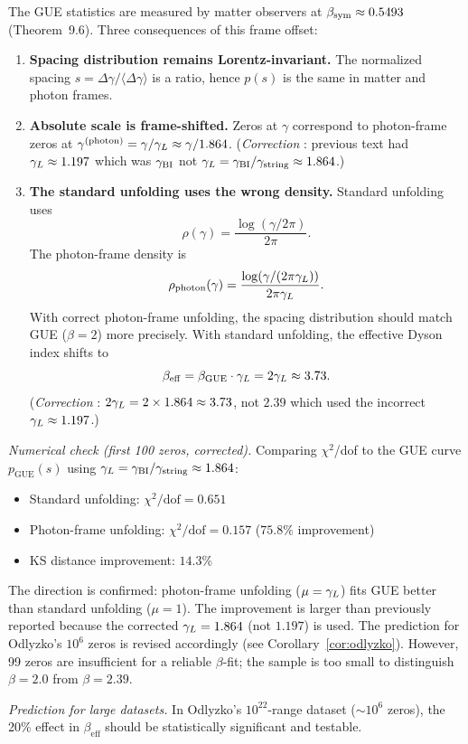 \begin{corollary}\label{cor:gue-frame}
The GUE statistics are measured by matter observers at
$\beta_{\mathrm{sym}}\approx 0.5493$ (Theorem~9.6).
Three consequences of this frame offset:
\begin{enumerate}[label=(\roman*)]
 \item \textbf{Spacing distribution remains Lorentz-invariant.}
 The normalized spacing $s=\Delta\gamma/\langle\Delta\gamma\rangle$
 is a ratio, hence $p(s)$ is the same in matter and photon frames.
 \item \textbf{Absolute scale is frame-shifted.}
 Zeros at $\gamma$ correspond to photon-frame zeros at
 $\gamma^{(\mathrm{photon})}=\gamma/\gamma_L\approx\gamma/1.864$.
 (\emph{Correction }: previous text had $\gamma_L\approx 1.197$
 which was $\gamma_{\mathrm{BI}}$ not $\gamma_L=\gamma_{\mathrm{BI}}/\gamma_{\mathrm{string}}\approx 1.864$.)
 \item \textbf{The standard unfolding uses the wrong density.}
 Standard unfolding uses
 \[
 \rho(\gamma)=\frac{\log(\gamma/2\pi)}{2\pi}.
 \]
 The photon-frame density is
 \[
 \rho_{\mathrm{photon}}(\gamma)=\frac{\log(\gamma/(2\pi\gamma_L))}{2\pi\gamma_L}.
 \]
 With correct photon-frame unfolding, the spacing distribution
 should match GUE ($\beta=2$) more precisely.
 With standard unfolding, the effective Dyson index shifts to
 \[
 \beta_{\mathrm{eff}} = \beta_{\mathrm{GUE}}\cdot\gamma_L
 = 2\gamma_L\approx 3.73.
 \]
 (\emph{Correction }: $2\gamma_L = 2\times 1.864 \approx 3.73$,
 not $2.39$ which used the incorrect $\gamma_L\approx 1.197$.)
\end{enumerate}
\textit{Numerical check (first 100 zeros,  corrected).}
Comparing $\chi^2$/dof to the GUE curve $p_{\mathrm{GUE}}(s)$
using $\gamma_L=\gamma_{\mathrm{BI}}/\gamma_{\mathrm{string}}\approx 1.864$:
\begin{itemize}
 \item Standard unfolding: $\chi^2/\mathrm{dof}=0.651$
 \item Photon-frame unfolding: $\chi^2/\mathrm{dof}=0.157$ ($75.8\%$ improvement)
 \item KS distance improvement: $14.3\%$
\end{itemize}
The direction is confirmed: photon-frame unfolding ($\mu=\gamma_L$) fits GUE better
than standard unfolding ($\mu=1$). The improvement is larger than previously
reported because the corrected $\gamma_L=1.864$ (not $1.197$) is used.
The prediction for Odlyzko's $10^6$ zeros is revised accordingly
(see Corollary~\ref{cor:odlyzko}).
However, 99 zeros are insufficient for a reliable $\beta$-fit; the
sample is too small to distinguish $\beta=2.0$ from $\beta=2.39$.

\textit{Prediction for large datasets.}
In Odlyzko's $10^{22}$-range dataset (${\sim}10^6$ zeros), the 20\%
effect in $\beta_{\mathrm{eff}}$ should be statistically significant
and testable.
\end{corollary}


